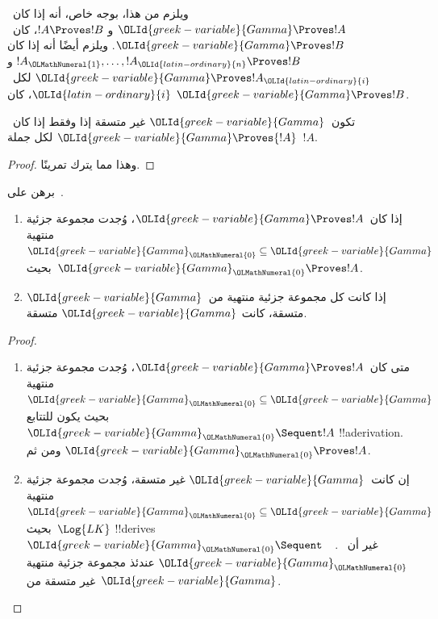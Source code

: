 \documentclass[../../../include/open-logic-section]{subfiles}
\begin{document}
ويلزم من هذا، بوجه خاص، أنه إذا كان~${\OLId{greek-variable}{Gamma}} \Proves !A$ و
$!A \Proves !B$، كان~${\OLId{greek-variable}{Gamma}} \Proves !B$. ويلزم أيضًا أنه إذا كان
$!A_{\OLMathNumeral{1}}, \dots, !A_{\OLId{latin-ordinary}{n}} \Proves !B$ و${\OLId{greek-variable}{Gamma}} \Proves !A_{\OLId{latin-ordinary}{i}}$ لكل~${\OLId{latin-ordinary}{i}}$، كان
${\OLId{greek-variable}{Gamma}} \Proves !B$.

\begin{prop}
تكون~${\OLId{greek-variable}{Gamma}}$ غير متسقة إذا وفقط إذا كان~${\OLId{greek-variable}{Gamma}} \Proves {!A}$ لكل
جملة~$!A$.
\end{prop}

\begin{proof}
وهذا مما يترك تمرينًا.
\end{proof}

\begin{prob}
برهن على~.
\end{prob}

\begin{prop}[التراص]
  \begin{enumerate}
  \item إذا كان~${\OLId{greek-variable}{Gamma}} \Proves !A$، وُجدت مجموعة جزئية منتهية
    ${\OLId{greek-variable}{Gamma}}_{\OLMathNumeral{0}} \subseteq {\OLId{greek-variable}{Gamma}}$ بحيث~${\OLId{greek-variable}{Gamma}}_{\OLMathNumeral{0}} \Proves !A$.
  \item إذا كانت كل مجموعة جزئية منتهية من~${\OLId{greek-variable}{Gamma}}$ متسقة، كانت
    ${\OLId{greek-variable}{Gamma}}$ متسقة.
  \end{enumerate}
\end{prop}

\begin{proof}
  \begin{enumerate}
    \item متى كان~${\OLId{greek-variable}{Gamma}} \Proves !A$، وُجدت مجموعة جزئية منتهية
      ${\OLId{greek-variable}{Gamma}}_{\OLMathNumeral{0}} \subseteq {\OLId{greek-variable}{Gamma}}$ بحيث يكون للتتابع
      ${\OLId{greek-variable}{Gamma}}_{\OLMathNumeral{0}} \Sequent !A$ !!a{derivation}. ومن ثم
      ${\OLId{greek-variable}{Gamma}}_{\OLMathNumeral{0}} \Proves !A$.
    \item إن كانت~${\OLId{greek-variable}{Gamma}}$ غير متسقة، وُجدت مجموعة جزئية منتهية
      ${\OLId{greek-variable}{Gamma}}_{\OLMathNumeral{0}} \subseteq {\OLId{greek-variable}{Gamma}}$ بحيث~$\Log{LK}$ !!{derive}s
      ${\OLId{greek-variable}{Gamma}}_{\OLMathNumeral{0}} \Sequent \quad$. غير أن~${\OLId{greek-variable}{Gamma}}_{\OLMathNumeral{0}}$ عندئذ مجموعة جزئية
      منتهية غير متسقة من~${\OLId{greek-variable}{Gamma}}$.
  \end{enumerate}
\end{proof}
\end{document}
